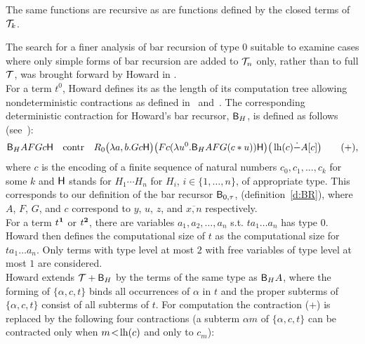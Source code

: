 \begin{prop}\label{p:Parsons}
The same functions are recursive
as are functions defined by the closed terms of $\mathcal{T}_k$.
\end{prop}
The search for a finer analysis of bar recursion of type $0$
suitable to examine cases where only simple forms of bar recursion
are added to $\mathcal{T}_n$ only, rather than to full $\mathcal{T}$, was brought forward
by Howard in \cite{Howard81}.\\
For a term $t^0$, Howard defines its  as 
the length of its computation tree allowing nondeterministic contractions 
as defined in~\cite{Howard80} and~\cite{Howard81}. The corresponding deterministic 
contraction for Howard's bar recursor, $\textsf{\upshape B}_H$, is defined as follows
(see~\cite{Howard81}): 
\[
\textsf{\upshape B}_H AFGc\textsf{\upshape H}\quad\text{contr}\quad R_0  \big(\lambda a,b.Gc\textsf{\upshape H}\big)  \big(Fc( \lambda u^0.\textsf{\upshape B}_H AFG(c*u) )\textsf{\upshape H}\big)   
                                                               \big( \operatorname{lh}(c) \dot- A[c]\big)
\tag{+}
\text{,}
\]
where $c$ is the encoding of a finite sequence of natural numbers $c_0, c_1, \ldots, c_k$ for some $k$
and $\textsf{\upshape H}$ stands for $H_1\cdots H_n$ for $H_i$, $i\in\{1, \ldots, n\}$, of appropriate type. %
This corresponds to our definition of the bar recursor $\textsf{\upshape B}_{0,\tau}$, (definition~\ref{d:BR}), where
$A$, $F$, $G$, and $c$ correspond to $y$, $u$, $z$, and $\overline{x,n}$ respectively. \\
For a term $t^\mathbf{1}$ or $t^\mathbf{2}$, there are variables $a_1, a_2, \ldots, a_n$ s.t. $ta_1\ldots a_n$ has type
$0$. Howard then defines the computational size of $t$ as the computational size for $ta_1\ldots a_n$. 
Only terms with type level at most $2$ with free variables of type level at most $1$ are considered.\\
Howard extends $\mathcal{T}+\textsf{\upshape B}_H$ by the terms  of the same type as $\textsf{\upshape B}_H A$, where
the forming of $\{\alpha, c, t\}$ binds all occurrences of $\alpha$ in $t$ and the proper subterms of
$\{\alpha, c, t\}$ consist of all subterms of $t$. For computation the contraction (+) is replaced by the
following four contractions (a subterm $\alpha m$ of $\{\alpha, c, t\}$ can be contracted only when
$m\!<\nolinebreak[4]\!\lh(c)$ and only to $c_m$):
